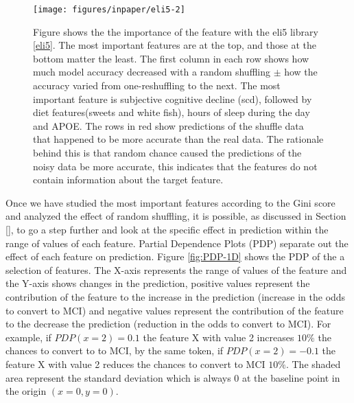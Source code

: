 \documentclass[preprint,12pt]{elsarticle}
\begin{document}
\begin{figure}[!htb]
        \centering
        \texttt{[image: figures/inpaper/eli5-2]}
        \caption{Figure shows the the importance of the feature with the eli5 library \ref{eli5}. The most important features are at the top, and those at the bottom matter the least. The first column in each row shows how much model accuracy decreased with a random shuffling $\pm$ how the accuracy varied from one-reshuffling to the next. The most important feature is subjective cognitive decline (scd), followed by diet features(sweets and white fish), hours of sleep during the day and APOE. The rows in red show predictions of the shuffle data that happened to be more accurate than the real data. The rationale behind this is that random chance caused the predictions of the noisy data be more accurate, this indicates that the features do not contain information about the target feature.} 
        \label{fig:eli5}
\end{figure}

Once we have studied the most important features according to the Gini score and analyzed the effect of random shuffling, it is possible, as discussed in Section \ref{}, to go a step further and look at the specific effect in prediction within the range of values of each feature.  
Partial Dependence Plots (PDP) separate out the effect of each feature on prediction. Figure \ref{fig:PDP-1D} shows the PDP of the a selection of features.  The X-axis represents the range of values of the feature and the Y-axis shows changes in the prediction, positive values represent the contribution of the feature to the increase in the prediction (increase in the odds to convert to MCI) and negative values represent the contribution of the feature to the decrease the prediction (reduction in the odds to convert to MCI).
For example, if $PDP(x=2)=0.1$ the feature X with value 2 increases $10\%$ the chances to convert to to MCI, by the same token, if $PDP(x=2)=-0.1$  
the feature X with value 2 reduces the chances to convert to MCI $10\%$. The shaded area represent the standard deviation which is always 0 at the baseline point in the origin $(x=0, y=0)$.
\end{document}
